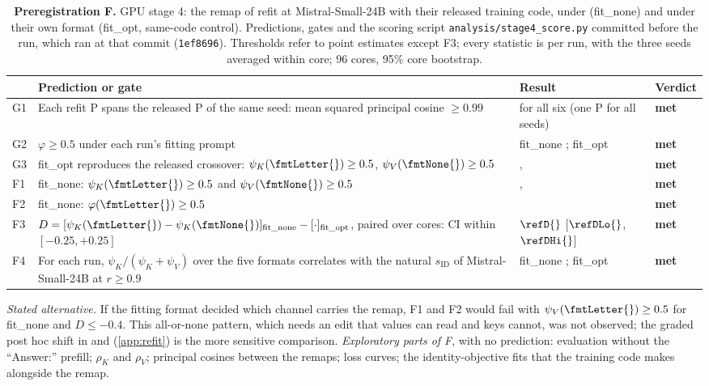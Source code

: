 \begin{table}[!ht]
\centering
\footnotesize
\caption{\textbf{Preregistration F.} GPU stage 4: the remap of \citet{anonymous2026fitted} refit at Mistral-Small-24B with their released training code, under \fmtNone{} (fit\_none) and under their own format (fit\_opt, same-code control). Predictions, gates and the scoring script \texttt{analysis/stage4\_score.py} committed before the run, which ran at that commit (\texttt{1ef8696}). Thresholds refer to point estimates except F3; every statistic is per run, with the three seeds averaged within core; 96 cores, 95\% core bootstrap.}
\label{tab:prereg-f}
\begin{tabular}{p{}p{}p{}p{}}
\toprule
 & Prediction or gate & Result & Verdict \\
\midrule
G1 & Each refit P spans the released P of the same seed: mean squared principal cosine $\geq 0.99$ & {} for all six (one P for all seeds) & \textbf{met} \\
G2 & $\varphi \geq 0.5$ under each run's fitting prompt & fit\_none \phiNoneRefNone{}; fit\_opt \phiOptRefOpt{} & \textbf{met} \\
G3 & fit\_opt reproduces the released crossover: $\psi_K(\text{\fmtLetter{}}) \geq 0.5$, $\psi_V(\text{\fmtNone{}}) \geq 0.5$ & \psiLetterRefOpt{}, \psiVNoneRefOpt{} & \textbf{met} \\
\midrule
F1 & fit\_none: $\psi_K(\text{\fmtLetter{}}) \geq 0.5$ and $\psi_V(\text{\fmtNone{}}) \geq 0.5$ & \psiLetterRefNone{}, \psiVNoneRefNone{} & \textbf{met} \\
F2 & fit\_none: $\varphi(\text{\fmtLetter{}}) \geq 0.5$ & \phiLetterRefNone{} & \textbf{met} \\
F3 & $D = [\psi_K(\text{\fmtLetter{}}) - \psi_K(\text{\fmtNone{}})]_{\text{fit\_none}} - [\cdot]_{\text{fit\_opt}}$, paired over cores: CI within $[-0.25, +0.25]$ & $\refD{}$ [$\refDLo{}$, $\refDHi{}$] & \textbf{met} \\
F4 & For each run, $\psi_K/(\psi_K+\psi_V)$ over the five formats correlates with the natural $s_{\mathrm{ID}}$ of Mistral-Small-24B at $r \geq 0.9$ & fit\_none {}; fit\_opt {} & \textbf{met} \\
\bottomrule
\end{tabular}

\smallskip
\begin{minipage}{0.94\textwidth}
\footnotesize
\emph{Stated alternative.} If the fitting format decided which channel carries the remap, F1 and F2 would fail with $\psi_V(\text{\fmtLetter{}}) \geq 0.5$ for fit\_none and $D \leq -0.4$. This all-or-none pattern, which needs an edit that values can read and keys cannot, was not observed; the graded post hoc shift in \fmtOpt{} and \fmtPost{} (\cref{app:refit}) is the more sensitive comparison. \emph{Exploratory parts of F}, with no prediction: evaluation without the ``Answer:'' prefill; $\rho_K$ and $\rho_V$; principal cosines between the remaps; loss curves; the identity-objective fits that the training code makes alongside the remap.
\end{minipage}
\end{table}

